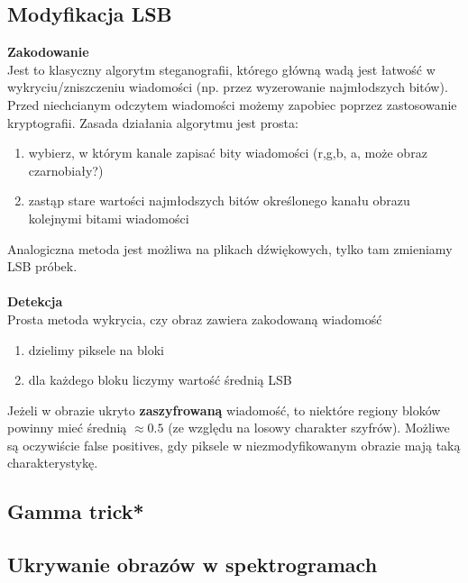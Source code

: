 \documentclass{article}
\begin{document}
\subsection{Modyfikacja LSB}
\textbf{Zakodowanie} \\
Jest to klasyczny algorytm steganografii, którego główną wadą jest łatwość w wykryciu/zniszczeniu wiadomości
(np. przez wyzerowanie najmłodszych bitów). Przed niechcianym odczytem wiadomości możemy zapobiec 
poprzez zastosowanie kryptografii. Zasada działania algorytmu jest prosta:
\begin{enumerate}
	\item wybierz, w którym kanale zapisać bity wiadomości (r,g,b, a, może obraz czarnobiały?)
	\item zastąp stare wartości najmłodszych bitów określonego kanału obrazu kolejnymi bitami wiadomości
\end{enumerate}
Analogiczna metoda jest możliwa na plikach dźwiękowych, tylko tam zmieniamy LSB próbek. \\\\
\textbf{Detekcja} \\
Prosta metoda wykrycia, czy obraz zawiera zakodowaną wiadomość
\begin{enumerate}
	\item dzielimy piksele na bloki
	\item dla każdego bloku liczymy wartość średnią LSB
\end{enumerate}
Jeżeli w obrazie ukryto \textbf{zaszyfrowaną} wiadomość, to niektóre regiony bloków
powinny mieć średnią $\approx 0.5$ (ze względu na losowy charakter szyfrów). Możliwe są
oczywiście false positives, gdy piksele w niezmodyfikowanym obrazie mają taką charakterystykę.

\subsection{Gamma trick*}
\subsection{Ukrywanie obrazów w spektrogramach}
\end{document}
